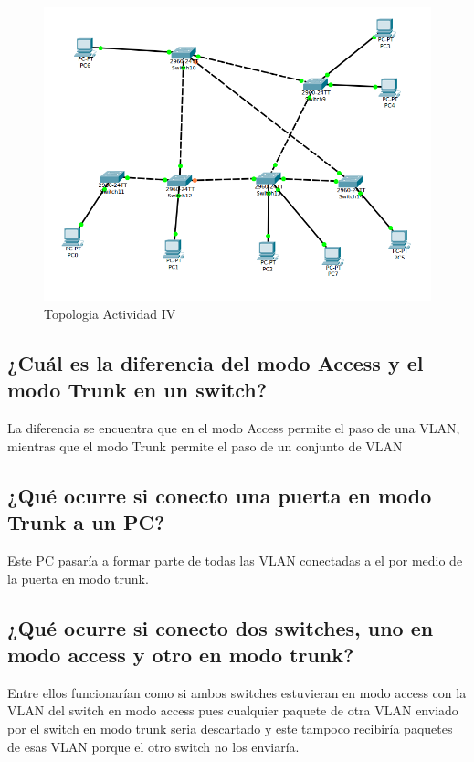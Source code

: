 \documentclass[spanish]{udpreport}
\begin{document}
\begin{figure}[H]
	\caption{Topologia Actividad IV}
	\label{fig:Figura 2.4}
	\centering
	\includegraphics[scale=.6]{imagenes/A4e.png}
	\linebreak
\end{figure}

\subsection{¿Cuál es la diferencia del modo Access y el modo Trunk en un switch?}
La diferencia se encuentra que en el modo Access permite el paso de una VLAN, mientras que el modo Trunk permite el paso de un conjunto de VLAN

\subsection{¿Qué ocurre si conecto una puerta en modo Trunk a un PC?}
Este PC pasaría a formar parte de todas las VLAN conectadas a el por medio de la puerta en modo trunk.

\subsection{¿Qué ocurre si conecto dos switches, uno en modo access y otro en modo trunk?}
Entre ellos funcionarían como si ambos switches estuvieran en modo access con la VLAN del switch en modo access pues cualquier paquete de otra VLAN enviado por el switch en modo trunk seria descartado y este tampoco recibiría paquetes de esas VLAN porque el otro switch no los enviaría.
\end{document}
